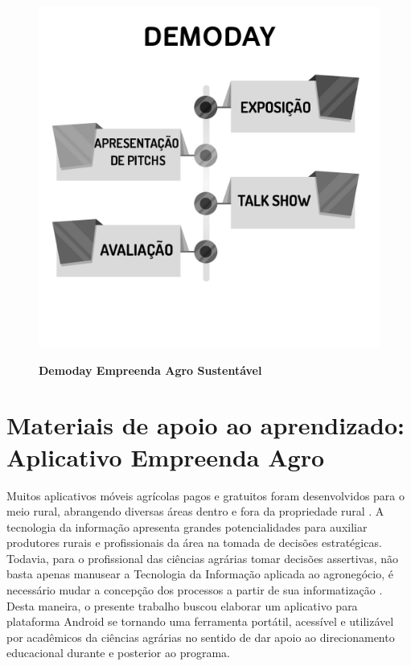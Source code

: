 \begin{figure}[H]
\centering
\caption{\textbf{Demoday Empreenda Agro Sustentável}}
\includegraphics[scale=0.4]{Imagens/workshop-04.png}
\label{figura_33}
\end{figure}


\section{Materiais de apoio ao aprendizado: Aplicativo Empreenda Agro}

Muitos aplicativos móveis agrícolas pagos e gratuitos foram desenvolvidos para o meio rural, abrangendo diversas áreas dentro e fora da propriedade rural \cite{silva_caracterizacao_2017}. A tecnologia da informação apresenta grandes potencialidades para auxiliar produtores rurais e profissionais da área na tomada de decisões estratégicas. Todavia, para o profissional das ciências agrárias tomar decisões assertivas, não basta apenas manusear a Tecnologia da Informação aplicada ao agronegócio, é   necessário   mudar a concepção dos processos a partir de sua informatização \cite{ferraz_tecnologia_2017}. Desta maneira, o presente trabalho buscou  elaborar um aplicativo para plataforma Android se tornando uma ferramenta portátil, acessível e utilizável por acadêmicos da ciências agrárias no sentido de dar apoio ao direcionamento educacional durante e posterior ao programa. 

